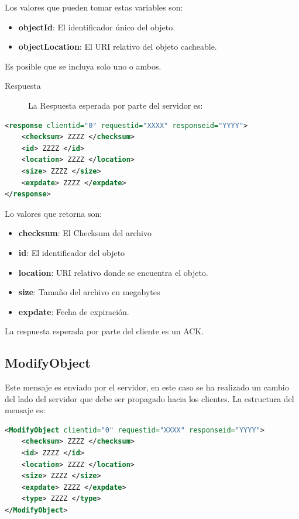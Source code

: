 Los valores que pueden tomar estas variables son:

\begin{itemize}
\item \textbf{objectId}: El identificador único del objeto.
\item \textbf{objectLocation}: El URI relativo del objeto cacheable.
\end{itemize}

Es posible que se incluya solo uno o ambos.

\begin{description}
\item[Respuesta] La Respuesta esperada por parte del servidor es:
\end{description}

\begin{lstlisting}[language=XML,caption=Mensaje de Respuesta de GetObjectInfo]
<response clientid="0" requestid="XXXX" responseid="YYYY"> 
	<checksum> ZZZZ </checksum>
	<id> ZZZZ </id>
	<location> ZZZZ </location>
	<size> ZZZZ </size>
	<expdate> ZZZZ </expdate>
</response>
\end{lstlisting}

Lo valores que retorna son:

\begin{itemize}
\item \textbf{checksum}:  El Checksum del archivo
\item \textbf{id}: El identificador del objeto
\item \textbf{location}: URI relativo donde se encuentra el objeto.
\item \textbf{size}: Tamaño del archivo en megabytes
\item \textbf{expdate}: Fecha de expiración.
\end{itemize}


La respuesta esperada por parte del cliente es un ACK.

\subsection{ModifyObject}
Este mensaje es enviado por el servidor, en este caso se ha realizado un cambio del lado del servidor que debe ser propagado hacia los clientes. La estructura del mensaje es:

\begin{lstlisting}[language=XML,caption=Mensaje de ModifyObject]
<ModifyObject clientid="0" requestid="XXXX" responseid="YYYY"> 
	<checksum> ZZZZ </checksum>
	<id> ZZZZ </id>
	<location> ZZZZ </location>
	<size> ZZZZ </size>
	<expdate> ZZZZ </expdate>
	<type> ZZZZ </type>
</ModifyObject>
\end{lstlisting}

